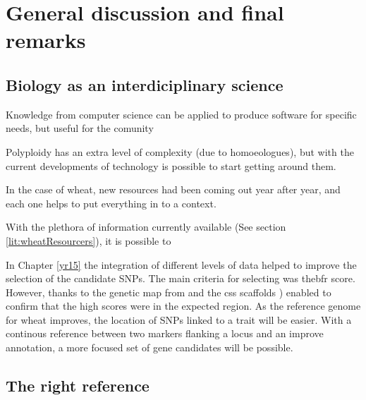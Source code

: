 
\chapter{General discussion and final remarks}


\section{Biology as an interdiciplinary science}

Knowledge from  computer science can be applied to produce software for specific needs, but useful for the comunity

Polyploidy has an extra level of complexity (due to homoeologues), but with the current developments of technology is possible to start getting around them. 



In the case of wheat, new resources had been coming out year after year, and each one helps to put everything in to a context. 

With the plethora of information currently available (See section \ref{lit:wheatResourcers}), it is possible to 


In Chapter \ref{yr15} the integration of different levels of data helped to improve the selection of the candidate SNPs. 
The main criteria for selecting   was the\acrshort{bfr} score.
However, thanks to the genetic map from \citet{Wang2014} and the \acrshort{css} scaffolds \citep{Mayer2014}) enabled to confirm that the high scores were in the expected region. 
As the reference genome for wheat improves, the location of SNPs linked to a trait will be easier. 
With a continous reference between two markers flanking a locus and an improve annotation, a more focused set of gene candidates will be possible. 


\section{The right reference}

